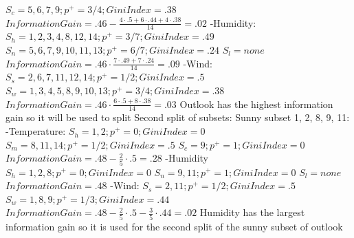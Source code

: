 \documentclass[12pt, fullpage,letterpaper]{article}
\begin{document}
\begin{enumerate}
\begin{enumerate}
	\newline $S_c=5, 6, 7, 9; p^+=3/4; Gini Index=.38$
	\newline $Information Gain=.46-\frac{4\cdot.5+6\cdot.44+4\cdot.38}{14}=.02$
	\newline -Humidity:
	\newline $S_h = 1, 2, 3, 4, 8, 12, 14; p^+=3/7; Gini Index=.49$
	\newline $S_n=5, 6, 7, 9, 10, 11, 13; p^+=6/7; Gini Index=.24$
	\newline $S_l=none$
	\newline $Information Gain=.46\cdot\frac{7\cdot.49+7\cdot.24}{14} = .09$
	\newline -Wind:
	\newline $S_s = 2, 6, 7, 11, 12, 14; p^+=1/2; Gini Index=.5$
	\newline $S_w=1, 3, 4, 5, 8, 9, 10, 13; p^+=3/4;Gini Index=.38$
	\newline $Information Gain=.46\cdot\frac{6\cdot.5+8\cdot.38}{14} = .03$
	\newline Outlook has the highest information gain so it will be used to split
	\newline
	\newline Second split of subsets:
	\newline Sunny subset 1, 2, 8, 9, 11:
	\newline -Temperature:
	\newline $S_h = 1, 2; p^+=0; Gini Index=0$
	\newline $S_m=8, 11, 14; p^+=1/2; Gini Index=.5$
	\newline $S_c=9; p^+=1; Gini Index=0$
	\newline $Information Gain=.48-\frac{2}{5}\cdot.5=.28$
	\newline -Humidity
	\newline $S_h = 1, 2, 8; p^+=0; Gini Index=0$
	\newline $S_n=9, 11; p^+=1; Gini Index=0$
	\newline $S_l=none$
	\newline $Information Gain=.48$
	\newline -Wind:
	\newline $S_s = 2,11; p^+=1/2; Gini Index=.5$
	\newline $S_w=1, 8, 9; p^+=1/3; Gini Index=.44$
	\newline $Information Gain=.48-\frac{2}{5}\cdot.5-\frac{3}{5}\cdot.44=.02$
	\newline Humidity has the largest information gain so it is used for the second split of the sunny subset of outlook

\end{enumerate}
\end{enumerate}
\end{document}
